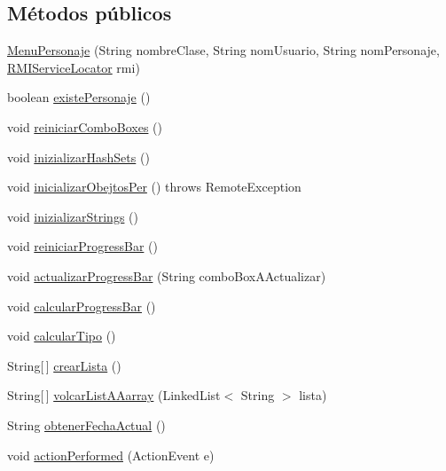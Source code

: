 \subsection*{Métodos públicos}
\begin{DoxyCompactItemize}
\item 
\hyperlink{classes_1_1deusto_1_1spq_1_1_t_e_scc_1_1ventanas_1_1_menu_personaje_a5ddd5cbbdb2d87f8541c37d2ae7feea6}{Menu\+Personaje} (String nombre\+Clase, String nom\+Usuario, String nom\+Personaje, \hyperlink{classes_1_1deusto_1_1spq_1_1_t_e_scc_1_1cliente_1_1_r_m_i_service_locator}{R\+M\+I\+Service\+Locator} rmi)
\item 
boolean \hyperlink{classes_1_1deusto_1_1spq_1_1_t_e_scc_1_1ventanas_1_1_menu_personaje_ad7ca7fcf44489ceacd767ad825eeb6b0}{existe\+Personaje} ()
\item 
void \hyperlink{classes_1_1deusto_1_1spq_1_1_t_e_scc_1_1ventanas_1_1_menu_personaje_ac085f2c43370fc01971bfa3e6097f768}{reiniciar\+Combo\+Boxes} ()
\item 
void \hyperlink{classes_1_1deusto_1_1spq_1_1_t_e_scc_1_1ventanas_1_1_menu_personaje_a87d4e80e81e4cb8a6ae23daa3b6e5938}{inizializar\+Hash\+Sets} ()
\item 
void \hyperlink{classes_1_1deusto_1_1spq_1_1_t_e_scc_1_1ventanas_1_1_menu_personaje_a9da923805fb3ea247a8332e9f56e7004}{inicializar\+Obejtos\+Per} ()  throws Remote\+Exception 
\item 
void \hyperlink{classes_1_1deusto_1_1spq_1_1_t_e_scc_1_1ventanas_1_1_menu_personaje_ad0936c89fc37412c29e22e9f415c4b4f}{inizializar\+Strings} ()
\item 
void \hyperlink{classes_1_1deusto_1_1spq_1_1_t_e_scc_1_1ventanas_1_1_menu_personaje_aa82435a6993747f7df4881f6eadf6609}{reiniciar\+Progress\+Bar} ()
\item 
void \hyperlink{classes_1_1deusto_1_1spq_1_1_t_e_scc_1_1ventanas_1_1_menu_personaje_a1fb433b9736274ac61537d826751e663}{actualizar\+Progress\+Bar} (String combo\+Box\+A\+Actualizar)
\item 
void \hyperlink{classes_1_1deusto_1_1spq_1_1_t_e_scc_1_1ventanas_1_1_menu_personaje_a3552e7ce3a5c41d17f1f29f7173363ae}{calcular\+Progress\+Bar} ()
\item 
void \hyperlink{classes_1_1deusto_1_1spq_1_1_t_e_scc_1_1ventanas_1_1_menu_personaje_a370d4d8f9ea3dc9d5cd421a44cce0983}{calcular\+Tipo} ()
\item 
String\mbox{[}$\,$\mbox{]} \hyperlink{classes_1_1deusto_1_1spq_1_1_t_e_scc_1_1ventanas_1_1_menu_personaje_a073e9dc8c06fec524a8e889723cf618e}{crear\+Lista} ()
\item 
String\mbox{[}$\,$\mbox{]} \hyperlink{classes_1_1deusto_1_1spq_1_1_t_e_scc_1_1ventanas_1_1_menu_personaje_ade52fe7d584c31499b7f0034f3f8f6d8}{volcar\+List\+A\+Aarray} (Linked\+List$<$ String $>$ lista)
\item 
String \hyperlink{classes_1_1deusto_1_1spq_1_1_t_e_scc_1_1ventanas_1_1_menu_personaje_a0bfab060e86fb75072be357901d71d81}{obtener\+Fecha\+Actual} ()
\item 
void \hyperlink{classes_1_1deusto_1_1spq_1_1_t_e_scc_1_1ventanas_1_1_menu_personaje_a2d37effefd80c5719805e02cc628e5fb}{action\+Performed} (Action\+Event e)
\end{DoxyCompactItemize}
